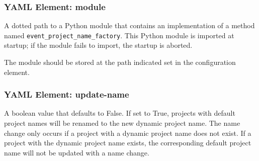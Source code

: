 \subsubsection{YAML Element: module}\label{sec:yaml-project-naming-module}

A dotted path to a Python module that contains an implementation of a method named\linebreak
\texttt{event\_project\_name\_factory}.  This Python module is imported at \cxoneflow
startup; if the module fails to import, the \cxoneflow startup is aborted.

The module should be stored at the path indicated set in the
 configuration element.

\subsubsection{YAML Element: update-name}\label{sec:yaml-project-naming-update-name}

A boolean value that defaults to False.  If set to True, projects with default project names
will be renamed to the new dynamic project name. The name change only occurs if a project with
a dynamic project name does not exist.  If a project with the dynamic project name exists,
the corresponding default project name will not be updated with a name change.
